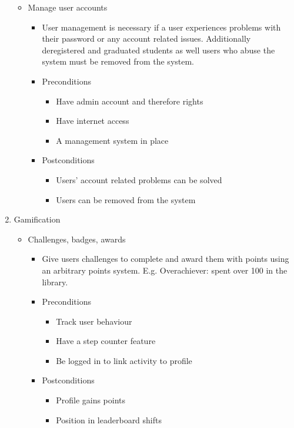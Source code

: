 \documentclass[12pt]{article}
\begin{document}
\begin{enumerate}
\begin{itemize}
				\item Manage user accounts
				\begin{itemize}
					\item User management is necessary if a user experiences problems with their password or any account related issues. Additionally deregistered and graduated students as well users who abuse the system must be removed from the system.
					\item Preconditions
					\begin{itemize}
						\item Have admin account and therefore rights
						\item Have internet access
						\item A management system in place
					\end{itemize}
					\item Postconditions
					\begin{itemize}
						\item Users’ account related problems can be solved
						\item Users can be removed from the system
					\end{itemize}
				\end{itemize}
				
			\end{itemize}
			
			\item Gamification 
			\begin{itemize}
				\item Challenges, badges, awards
				\begin{itemize}
					\item Give users challenges to complete and award them with points using an arbitrary points system. E.g. Overachiever: spent over 100 in the library. 
					\item Preconditions
					\begin{itemize}
						\item Track user behaviour
						\item Have a step counter feature
						\item Be logged in to link activity to profile
					\end{itemize}
					\item Postconditions
					\begin{itemize}
						\item Profile gains points
						\item Position in leaderboard shifts
					\end{itemize}
				\end{itemize}
				

\end{itemize}
\end{enumerate}
\end{document}
